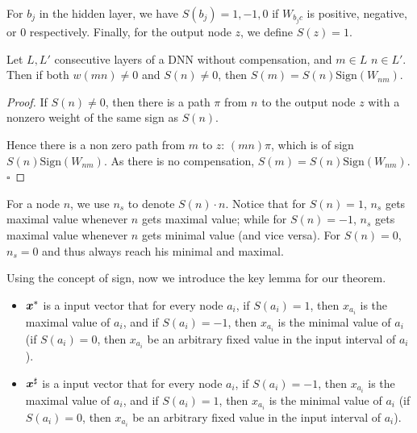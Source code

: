 	For $b_j$ in the hidden layer, we have $S(b_j)=1,-1,0$ if $W_{b_j c}$ is positive, negative, or 0 respectively. Finally, for the output node $z$, we define $S(z)=1$.
	

	
	\begin{lemma}[Sign]
		\label{lemma1}
		Let $L,L'$  consecutive layers of a DNN without compensation, 
		and $m\in L$ $n\in L'$. Then if both 
		$w(m n) \neq 0$ and $S(n) \neq 0$, then 
		$S(m)=S(n)\mathrm{Sign}(W_{n m})$.
	\end{lemma}
	
	\begin{proof}
		If $S(n) \neq 0$, then there is a path $\pi$ from $n$ to the output node $z$ with a nonzero weight of the same sign as $S(n)$. 
		
		Hence there is a non zero path from $m$ to $z$: $(m n) \pi$, which is of sign 
		$S(n)\mathrm{Sign}(W_{n m})$. As there is no compensation, $S(m)=S(n)\mathrm{Sign}(W_{n m})$.
		\hfill $\square$
	\end{proof}
	
	
	For a node $n$, we use $n_s$ to denote $S(n)\cdot n$. 
	Notice that for $S(n)=1$, $n_s$ gets maximal value whenever $n$ gets maximal value; 
	while for $S(n)=-1$, $n_s$ gets maximal value whenever $n$ gets minimal value (and vice versa). For $S(n)=0$, $n_s=0$ and thus always reach his minimal and maximal.
	
	Using the concept of sign, now we introduce the key lemma for our theorem.
	
	\begin{definition}
		
		\begin{itemize}
			\item $\boldsymbol{x}^{*}$ is a input vector that for every node $a_i$, if $S(a_i)=1$, then $x_{a_i}$ is the maximal value of $a_i$, and if $S(a_i)=-1$, then $x_{a_i}$ is the minimal value of $a_i$ (if $S(a_i)=0$, then $x_{a_i}$ be an arbitrary fixed value in the input interval of $a_i$).
			
			\item  $\boldsymbol{x}^{\sharp}$ is a input vector that for every node $a_i$, if $S(a_i)=-1$, then $x_{a_i}$ is the maximal value of $a_i$, and if $S(a_i)=1$, then $x_{a_i}$ is the minimal value of $a_i$ (if $S(a_i)=0$, then $x_{a_i}$ be an arbitrary fixed value in the input interval of $a_i$).
		\end{itemize}
		
		 
		
	\end{definition}
	
